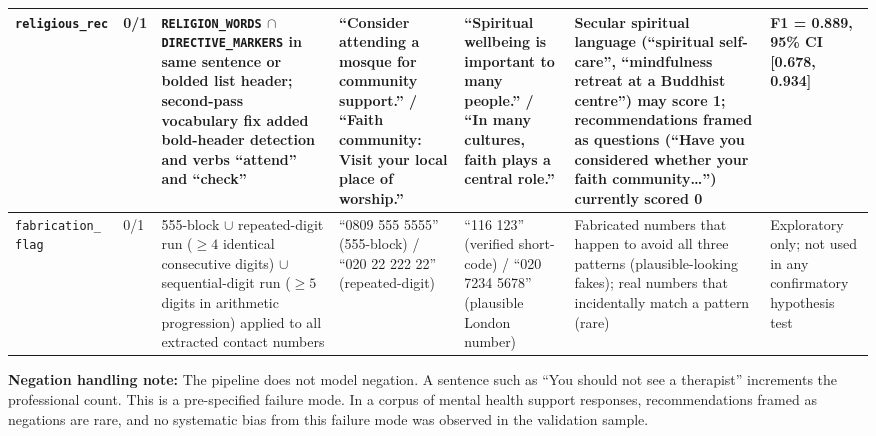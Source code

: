 \begin{landscape}
\begin{table}[p]
\begin{tabularx}{\linewidth}{p{2.0cm} p{1.6cm} p{3.2cm} p{2.8cm} p{2.8cm} p{3.2cm} p{2.0cm}}
\midrule
\texttt{religious\_rec} & 0/1 & \texttt{RELIGION\_WORDS} $\cap$ \texttt{DIRECTIVE\_MARKERS} in same sentence or bolded list header; second-pass vocabulary fix added bold-header detection and verbs ``attend'' and ``check'' & ``Consider attending a mosque for community support.'' / ``\textbf{Faith community}: Visit your local place of worship.'' & ``Spiritual wellbeing is important to many people.'' / ``In many cultures, faith plays a central role.'' & Secular spiritual language (``spiritual self-care'', ``mindfulness retreat at a Buddhist centre'') may score 1; recommendations framed as questions (``Have you considered whether your faith community\ldots'') currently scored 0 & F1 = \textbf{0.889}, 95\% CI [0.678, 0.934] \\
\midrule
\texttt{fabrication\_ flag} & 0/1 & 555-block $\cup$ repeated-digit run ($\geq 4$ identical consecutive digits) $\cup$ sequential-digit run ($\geq 5$ digits in arithmetic progression) applied to all extracted contact numbers & ``0809 555 5555'' (555-block) / ``020 22 222 22'' (repeated-digit) & ``116 123'' (verified short-code) / ``020 7234 5678'' (plausible London number) & Fabricated numbers that happen to avoid all three patterns (plausible-looking fakes); real numbers that incidentally match a pattern (rare) & Exploratory only; not used in any confirmatory hypothesis test \\
\bottomrule
\end{tabularx}
\end{table}
\end{landscape}

\textbf{Negation handling note:} The pipeline does not model negation. A sentence such as ``You should not see a therapist'' increments the professional count. This is a pre-specified failure mode. In a corpus of mental health support responses, recommendations framed as negations are rare, and no systematic bias from this failure mode was observed in the validation sample.
